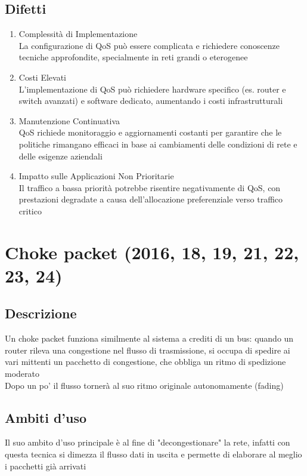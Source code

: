 \documentclass[10pt,oneside,a4paper]{article}
\begin{document}
\subsection{Difetti}
\begin{enumerate}
\item Complessità di Implementazione\\
La configurazione di QoS può essere complicata e richiedere conoscenze tecniche approfondite, specialmente in reti grandi o eterogenee
\item Costi Elevati\\
L'implementazione di QoS può richiedere hardware specifico (es. router e switch avanzati) e software dedicato, aumentando i costi infrastrutturali
\item Manutenzione Continuativa\\
QoS richiede monitoraggio e aggiornamenti costanti per garantire che le politiche rimangano efficaci in base ai cambiamenti delle condizioni di rete e delle esigenze aziendali
\item Impatto sulle Applicazioni Non Prioritarie\\
Il traffico a bassa priorità potrebbe risentire negativamente di QoS, con prestazioni degradate a causa dell'allocazione preferenziale verso traffico critico
\end{enumerate}
\section{Choke packet (2016, 18, 19, 21, 22, 23, 24)}
\subsection{Descrizione}
Un choke packet funziona similmente al sistema a crediti di un bus: quando un router rileva una congestione nel flusso di trasmissione, si occupa di spedire ai vari mittenti un pacchetto di congestione, che obbliga un ritmo di spedizione moderato\\
Dopo un po’ il flusso tornerà al suo ritmo originale autonomamente (fading)
\subsection{Ambiti d'uso}
Il suo ambito d'uso principale è al fine di "decongestionare" la rete, infatti con questa tecnica si dimezza il flusso dati in uscita e permette di elaborare al meglio i pacchetti già arrivati
\end{document}
